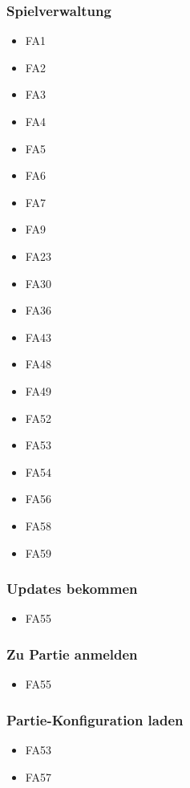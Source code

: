 \subsubsection{Spielverwaltung}
\begin{itemize} 
	\item FA1
	\item FA2 
	\item FA3 
	\item FA4 
	\item FA5 
	\item FA6 
	\item FA7 
	\item FA9 
	\item FA23 
	\item FA30 
	\item FA36 
	\item FA43 
	\item FA48 
	\item FA49 
	\item FA52 
	\item FA53 
	\item FA54 
	\item FA56 
	\item FA58 
	\item FA59 
\end{itemize}
\subsubsection{Updates bekommen}
\begin{itemize} 
	\item FA55
\end{itemize}
\subsubsection{Zu Partie anmelden}
\begin{itemize} 
	\item FA55
\end{itemize}
\subsubsection{Partie-Konfiguration laden}
\begin{itemize} 
	\item FA53
	\item FA57
\end{itemize}
